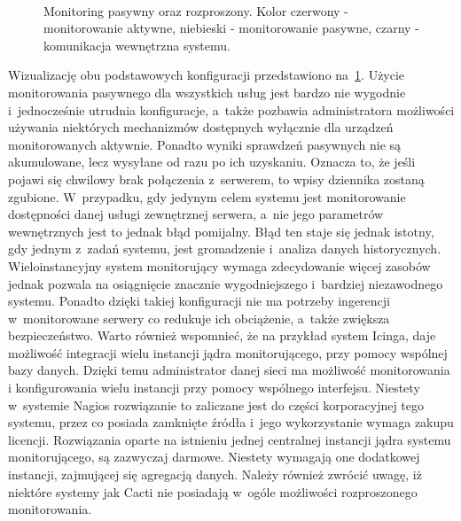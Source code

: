\begin{figure}[h]
\label{fig:PorPasIRozp}
  \caption{Monitoring pasywny oraz rozproszony. Kolor czerwony -
    monitorowanie aktywne, niebieski - monitorowanie pasywne, czarny -
    komunikacja wewnętrzna systemu.}
\\[0.1cm]
\end{figure}

Wizualizację obu podstawowych konfiguracji przedstawiono
na~\ref{fig:PorPasIRozp}. Użycie monitorowania pasywnego dla
wszystkich usług jest bardzo nie wygodnie i~jednocześnie utrudnia
konfiguracje, a~także pozbawia administratora możliwości używania
niektórych mechanizmów dostępnych wyłącznie dla urządzeń
monitorowanych aktywnie. Ponadto wyniki sprawdzeń pasywnych nie są
akumulowane, lecz wysyłane od razu po ich uzyskaniu. Oznacza to, że
jeśli pojawi się chwilowy brak połączenia z~serwerem, to wpisy
dziennika zostaną zgubione. W~przypadku, gdy jedynym celem systemu
jest monitorowanie dostępności danej usługi zewnętrznej serwera, a~nie
jego parametrów wewnętrznych jest to jednak błąd pomijalny. Błąd ten
staje się jednak istotny, gdy jednym z~zadań systemu, jest gromadzenie
i~analiza danych historycznych. Wieloinstancyjny system monitorujący
wymaga zdecydowanie więcej zasobów jednak pozwala na osiągnięcie
znacznie wygodniejszego i~bardziej niezawodnego systemu. Ponadto
dzięki takiej konfiguracji nie ma potrzeby ingerencji w~monitorowane
serwery co redukuje ich obciążenie, a~także zwiększa
bezpieczeństwo. Warto również wspomnieć, że na przykład system Icinga,
daje możliwość integracji wielu instancji jądra monitorującego, przy
pomocy wspólnej bazy danych. Dzięki temu administrator danej sieci ma
możliwość monitorowania i konfigurowania wielu instancji przy pomocy
wspólnego interfejsu. Niestety w~systemie Nagios rozwiązanie to
zaliczane jest do części korporacyjnej tego systemu, przez co posiada
zamknięte źródła i~jego wykorzystanie wymaga zakupu
licencji. Rozwiązania oparte na istnieniu jednej centralnej instancji
jądra systemu monitorującego, są zazwyczaj darmowe. Niestety wymagają
one dodatkowej instancji, zajmującej się agregacją danych. Należy
również zwrócić uwagę, iż niektóre systemy jak Cacti nie posiadają
w~ogóle możliwości rozproszonego monitorowania.

